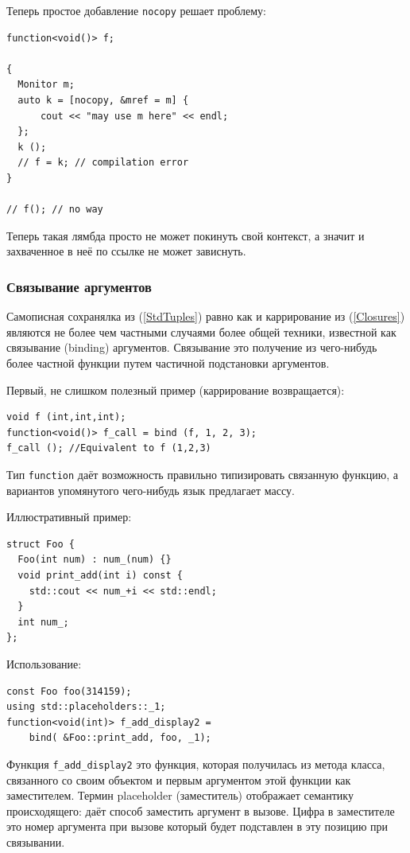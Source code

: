 \documentclass[a4paper,12pt,oneside]{article}
\begin{document}
Теперь простое добавление \lstinline!nocopy! решает проблему:

\begin{lstlisting}
function<void()> f;

{
  Monitor m;
  auto k = [nocopy, &mref = m] { 
      cout << "may use m here" << endl; 
  };
  k ();
  // f = k; // compilation error
}

// f(); // no way
\end{lstlisting}

Теперь такая лямбда просто не может покинуть свой контекст, а значит и захваченное в неё по ссылке не может зависнуть.

\subsubsection{Связывание аргументов}\label{Binding}

Самописная сохранялка из (\ref{StdTuples}) равно как и каррирование из (\ref{Closures}) являются не более чем частными случаями более общей техники, известной как связывание (binding) аргументов. Связывание это получение из чего-нибудь более частной функции путем частичной подстановки аргументов. 

Первый, не слишком полезный пример (каррирование возвращается):

\begin{lstlisting}
void f (int,int,int);
function<void()> f_call = bind (f, 1, 2, 3);
f_call (); //Equivalent to f (1,2,3)
\end{lstlisting}

Тип \lstinline!function! даёт возможность правильно типизировать связанную функцию, а вариантов упомянутого чего-нибудь язык предлагает массу.

Иллюстративный пример:

\begin{lstlisting}
struct Foo {
  Foo(int num) : num_(num) {}
  void print_add(int i) const { 
    std::cout << num_+i << std::endl; 
  }
  int num_;
};
\end{lstlisting}

Использование:

\begin{lstlisting}
const Foo foo(314159);
using std::placeholders::_1;
function<void(int)> f_add_display2 = 
    bind( &Foo::print_add, foo, _1);
\end{lstlisting}

Функция \lstinline!f_add_display2! это функция, которая получилась из метода класса, связанного со своим объектом и первым аргументом этой функции как заместителем. Термин placeholder (заместитель) отображает семантику происходящего: даёт способ заместить аргумент в вызове. Цифра в заместителе это номер аргумента при вызове который будет подставлен в эту позицию при связывании.
\end{document}
